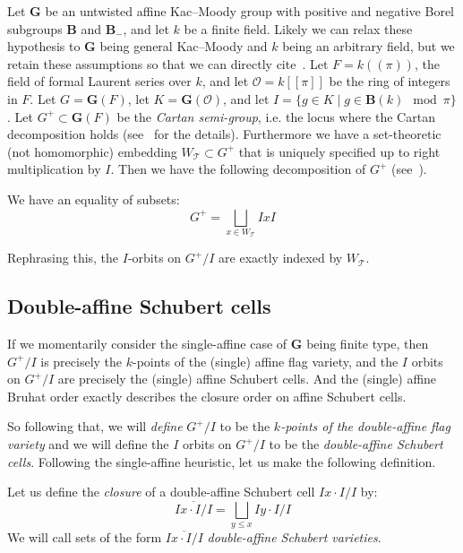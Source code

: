 \documentclass[ALCO,ThmDefs,Unicode]{cedram}
\newcommand{\bB}{\mathbf{B}}
\newcommand{\bG}{\mathbf{G}}
\newcommand{\cO}{\mathcal{O}}
\newcommand{\cT}{\mathcal{T}}
\newcommand{\suchthat}{\mid}
\newcommand{\WTits}{W_{\TitsCone}}
\newcommand{\TitsCone}{\cT}
\begin{document}
Let $\bG$ be an untwisted affine Kac--Moody group with positive and negative Borel subgroups $\bB$ and $\bB_-$, and let $k$ be a finite field. Likely we can relax these hypothesis to $\bG$ being general Kac--Moody and $k$ being an arbitrary field, but we retain these assumptions so that we can directly cite~\cite{BKP}. Let $F = k((\pi))$, the field of formal Laurent series over $k$, and let $\cO = k[[\pi]]$ be the ring of integers in $F$. Let $G = \bG(F)$, let $K = \bG(\cO)$, and let $I = \{ g \in K \suchthat g \in \bB(k) \mod \pi \}$. Let $G^+ \subset \bG(F)$ be the \emph{Cartan semi-group}, i.e. the locus where the Cartan decomposition holds (see~\cite{BKP,M} for the details). Furthermore we have a set-theoretic (not homomorphic) embedding $\WTits \subset G^+$ that is uniquely specified up to right multiplication by $I$. Then we have the following decomposition of $G^+$ (see~\cite[Proposition~3.4.2 and Lemma~3.4.3]{BKP}).
\begin{prop}
We have an equality of subsets:
\begin{equation}\label{eq:25}
G^+ = \bigsqcup_{x\in\WTits} I x I
\end{equation}
\end{prop}

Rephrasing this, the $I$-orbits on $G^+/I$ are exactly indexed by $\WTits$.

\subsection{Double-affine Schubert cells}

If we momentarily consider the single-affine case of $\bG$ being finite type, then $G^+/I$ is precisely the $k$-points of the (single) affine flag variety, and the $I$ orbits on $G^+/I$ are precisely the (single) affine Schubert cells. And the (single) affine Bruhat order exactly describes the closure order on affine Schubert cells.

So following that, we will \emph{define} $G^+/I$ to be the \emph{$k$-points of the double-affine flag variety} and we will define the $I$ orbits on $G^+/I$ to be the \emph{double-affine Schubert cells}. Following the single-affine heuristic, let us make the following definition.

\begin{defi}
Let us define the \emph{closure} of a double-affine Schubert cell $Ix\cdot I/I$ by:
\begin{equation}\label{eq:26}
\overline{Ix \cdot I/I} = \bigsqcup_{y \leq x} I y \cdot I/I
\end{equation}
We will call sets of the form $\overline{Ix \cdot I/I}$ \emph{double-affine Schubert varieties}.
\end{defi}
\end{document}
